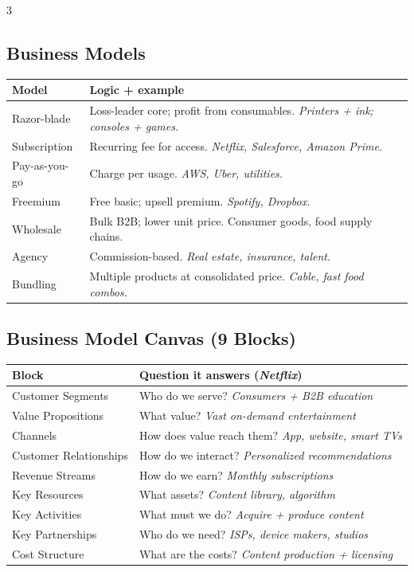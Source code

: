 \documentclass[7.6pt,letterpaper]{article}
\newcommand{\T}[1]{\textbf{\color{navy}#1}}
\newcommand{\eg}[1]{\textit{\color{mid}#1}}
\newcommand{\sh}{\rowcolor{strip}}
\newcommand{\ctab}[1]{{\fontsize{6.2pt}{7pt}\selectfont\setlength{\tabcolsep}{2.5pt}#1}}
\begin{document}
\begin{multicols}{3}
\subsection{Business Models}

\ctab{\begin{tabular}{@{}p{1.5cm}p{4.1cm}@{}}
\toprule
\sh \T{Model} & \T{Logic + example} \\
\midrule
Razor-blade & Loss-leader core; profit from consumables. \eg{Printers + ink; consoles + games.} \\
Subscription & Recurring fee for access. \eg{Netflix, Salesforce, Amazon Prime.} \\
Pay-as-you-go & Charge per usage. \eg{AWS, Uber, utilities.} \\
Freemium & Free basic; upsell premium. \eg{Spotify, Dropbox.} \\
Wholesale & Bulk B2B; lower unit price. Consumer goods, food supply chains. \\
Agency & Commission-based. \eg{Real estate, insurance, talent.} \\
Bundling & Multiple products at consolidated price. \eg{Cable, fast food combos.} \\
\bottomrule
\end{tabular}}

\subsection{Business Model Canvas (9 Blocks)}

\ctab{\begin{tabular}{@{}p{1.8cm}p{3.8cm}@{}}
\toprule
\sh \T{Block} & \T{Question it answers (\eg{Netflix})} \\
\midrule
Customer Segments & Who do we serve? \eg{Consumers + B2B education} \\
Value Propositions & What value? \eg{Vast on-demand entertainment} \\
Channels & How does value reach them? \eg{App, website, smart TVs} \\
Customer Relationships & How do we interact? \eg{Personalized recommendations} \\
Revenue Streams & How do we earn? \eg{Monthly subscriptions} \\
Key Resources & What assets? \eg{Content library, algorithm} \\
Key Activities & What must we do? \eg{Acquire + produce content} \\
Key Partnerships & Who do we need? \eg{ISPs, device makers, studios} \\
Cost Structure & What are the costs? \eg{Content production + licensing} \\
\bottomrule
\end{tabular}}


\end{multicols}
\end{document}
